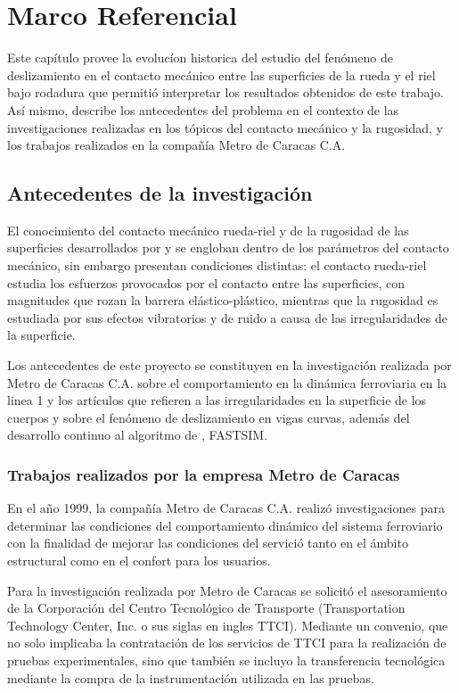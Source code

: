 \documentclass[main]{subfiles}
\begin{document}
\chapter{Marco Referencial}

	Este capítulo provee la evolucíon historica del estudio del fenómeno de deslizamiento en el contacto mecánico entre las superficies de la rueda y el riel bajo rodadura que permitió interpretar los resultados obtenidos de este trabajo. Así mismo, describe los antecedentes del problema en el contexto de las investigaciones realizadas en los tópicos del contacto mecánico y la rugosidad, y los trabajos realizados en la compañía Metro de Caracas C.A.

\section{Antecedentes de la investigación}

	 El conocimiento del contacto mecánico rueda-riel y de la rugosidad de las superficies desarrollados  por \citet{Kalker1982VSD} y \citet{Greenwood06121966} se engloban dentro de los parámetros del contacto mecánico, sin embargo presentan condiciones distintas: el contacto rueda-riel estudia los esfuerzos provocados por el contacto entre las superficies, con magnitudes que rozan la barrera elástico-plástico, mientras que la rugosidad es estudiada por sus efectos vibratorios y de ruido a causa de las irregularidades de la superficie.
	 
	 Los antecedentes de este proyecto se constituyen en la investigación realizada por Metro de Caracas C.A. sobre el comportamiento en la dinámica ferroviaria en la linea 1 y los artículos que refieren a las irregularidades en la superficie de los cuerpos y sobre el fenómeno de deslizamiento en vigas curvas, además del desarrollo continuo al algoritmo de \citet{Kalker1982VSD}, FASTSIM.

\subsection{Trabajos realizados por la empresa Metro de Caracas}

	En el año 1999, la compañía Metro de Caracas C.A. realizó investigaciones para determinar las condiciones del comportamiento dinámico del sistema ferroviario con la finalidad  de mejorar las condiciones del servició tanto en el ámbito estructural como en el confort para los usuarios.

	Para la investigación realizada por Metro de Caracas se solicitó el asesoramiento de la Corporación del Centro Tecnológico de Transporte (Transportation Technology Center, Inc. o sus siglas en ingles TTCI). Mediante un convenio, que no solo implicaba la contratación de los servicios de TTCI para la realización de pruebas experimentales, sino que también se incluyo la transferencia tecnológica mediante la compra de la instrumentación utilizada en las pruebas.
\end{document}
